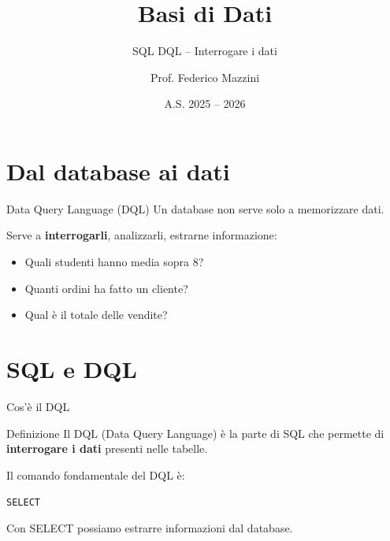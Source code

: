 \documentclass{beamer}
\title{Basi di Dati}
\subtitle{SQL DQL -- Interrogare i dati}
\author{Prof. Federico Mazzini}
\institute{I.I.S. Francesco Alberghetti}
\date{A.S. 2025 -- 2026}
\begin{document}
\begin{frame}
\titlepage
\end{frame}

\section{Dal database ai dati}

\begin{frame}{Data Query Language (DQL)}
Un database non serve solo a memorizzare dati.

\medskip
Serve a \textbf{interrogarli}, analizzarli, estrarne informazione:

\begin{itemize}
    \item Quali studenti hanno media sopra 8?
    \item Quanti ordini ha fatto un cliente?
    \item Qual è il totale delle vendite?
\end{itemize}

\end{frame}

\section{SQL e DQL}

\begin{frame}{Cos'è il DQL}
\begin{block}{Definizione}
Il DQL (Data Query Language) è la parte di SQL che permette di \textbf{interrogare i dati} presenti nelle tabelle.
\end{block}

\medskip
Il comando fondamentale del DQL è:

\begin{center}
\Large \texttt{SELECT}
\end{center}

\medskip
Con SELECT possiamo estrarre informazioni dal database.
\end{frame}
\end{document}
